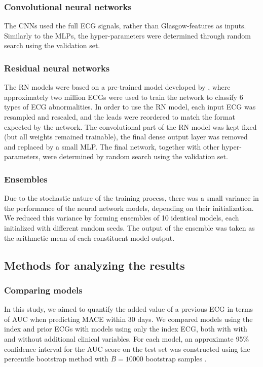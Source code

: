 \documentclass[preprint]{elsarticle}
\begin{document}
\subsubsection{Convolutional neural networks}
The CNNs used the full ECG signals, rather than Glasgow-features as inputs. Similarly to the MLPs, the hyper-parameters were determined through random search using the validation set.

\subsubsection{Residual neural networks}
The RN models were based on a pre-trained model developed by \citet{ribeiro2020}, where approximately two million ECGs were used to train the network to classify 6 types of ECG abnormalities. In order to use the RN model, each input ECG was resampled and rescaled, and the leads were reordered to match the format expected by the network. The convolutional part of the RN model was kept fixed (but all weights remained trainable), the final dense output layer was removed and replaced by a small MLP. The final network, together with other hyper-parameters, were determined by random search using the validation set. 

\subsubsection{Ensembles}
Due to the stochastic nature of the training process, there was a small variance in the performance of the neural network models, depending on their initialization. We reduced this variance by forming ensembles of 10 identical models, each initialized with different random seeds. The output of the ensemble was taken as the arithmetic mean of each constituent model output.

\subsection{Methods for analyzing the results}
\subsubsection{Comparing models}
In this study, we aimed to quantify the added value of a previous ECG in terms of AUC  when predicting MACE within 30 days. We compared models using the index and prior ECGs with models using only the index ECG, both with with and without additional clinical variables. For each model, an approximate 95\% confidence interval for the AUC score on the test set was constructed using the percentile bootstrap method with $B=10000$ bootstrap samples \citep{efron1981}.
\end{document}

